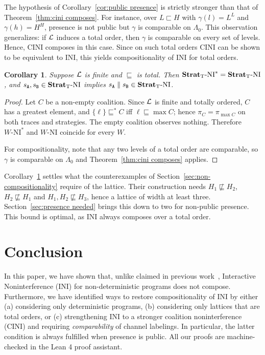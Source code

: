 \documentclass[preprint,5p,twocolumn]{elsarticle}
\newtheorem{corollary}[theorem]{Corollary}
\begin{document}
The hypothesis of Corollary~\ref{cor:public presence} is strictly stronger than that of
Theorem~\ref{thm:cini composes}. For instance,
over $L \sqsubset H$ with $\gamma(l) = L^L$ and $\gamma(h) = H^H$,
presence is not public but $\gamma$ is comparable on
$\Lambda_0$. This observation generalizes: if $\mathcal{L}$ induces a total order, then $\gamma$ is
comparable on every set of levels. Hence, CINI composes in this case. Since on such total orders
CINI can be shown to be equivalent to INI, this yields compositionality of INI
for total orders.

\begin{corollary}
  \label{cor:total order}
  Suppose $\mathcal{L}$ is finite and $\sqsubseteq$ is total. Then $\mathbf{Strat}_{\mathrm{T}}\text{-}\mathrm{NI}^* = \mathbf{Strat}_{\mathrm{T}}\text{-}\mathrm{NI}$, and
  $s_{\mathtt{A}}, s_{\mathtt{B}} \in \mathbf{Strat}_{\mathrm{T}}\text{-}\mathrm{NI}$ implies $s_{\mathtt{A}} \parallel s_{\mathtt{B}} \in \mathbf{Strat}_{\mathrm{T}}\text{-}\mathrm{NI}$.
\end{corollary}
\begin{proof}
  Let $C$ be a non-empty coalition. Since $\mathcal{L}$ is finite and totally ordered, $C$ has a
  greatest element, and $\lbrace \ell \rbrace \sqsubseteq^* C$ iff $\ell \sqsubseteq \max C$; hence
  $\pi_C = \pi_{\max C}$ on both traces and strategies. The empty coalition observes nothing.
  Therefore $W\text{-NI}^*$ and $W\text{-NI}$ coincide for every $W$.

  For compositionality, note that any two levels of a total order are comparable, so $\gamma$ is
  comparable on $\Lambda_0$ and Theorem~\ref{thm:cini composes}
  applies.
\end{proof}

Corollary~\ref{cor:total order} settles what the counterexamples of
Section~\ref{sec:non-compositionality} require of the lattice. Their construction needs
$H_1 \not\sqsubseteq H_2$, $H_2 \not\sqsubseteq H_1$ and $H_1, H_2 \not\sqsubseteq H_3$, hence a
lattice of width at least three. Section~\ref{sec:presence needed} brings this down to two for
non-public presence. This bound is optimal, as INI always composes over a total order.

\section{Conclusion}

\label{sec:conclusion}

In this paper, we have shown that, unlike claimed in previous work~\cite{Rafnsson2012,Rafnsson2014}, Interactive Noninterference (INI) for non-deterministic programs does not compose.
Furthermore, we have identified ways to restore compositionality of INI by either
(a) considering only deterministic programs,
(b) considering only lattices that are total orders, or
(c) strengthening INI to a stronger coalition noninterference (CINI) and requiring
\emph{comparability} of channel labelings. In particular, the latter condition is always
fulfilled when presence is public. All our proofs are machine-checked in the Lean 4 proof assistant.
\end{document}

